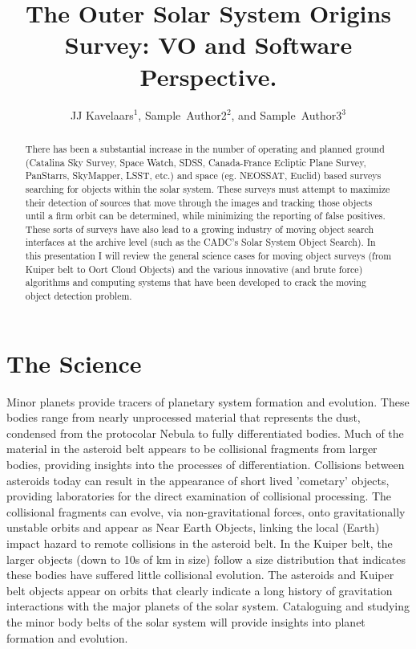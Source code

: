\documentclass[11pt,twoside]{article}
\begin{document}
\title{The Outer Solar System Origins Survey: VO and Software Perspective.}
\author{JJ Kavelaars$^1$, Sample~Author2$^2$, and Sample~Author3$^3$}

\begin{abstract}
There has been a substantial increase in the number of operating and planned ground (Catalina Sky Survey, Space Watch, SDSS, Canada-France Ecliptic Plane Survey, PanStarrs, SkyMapper, LSST, etc.) and space (eg. NEOSSAT, Euclid) based surveys searching for objects within the solar system. These surveys must attempt to maximize their detection of sources that move through the images and tracking those objects until a firm orbit can be determined, while minimizing the reporting of false positives. These sorts of surveys have also lead to a growing industry of moving object search interfaces at the archive level (such as the CADC's Solar System Object Search). In this presentation I will review the general science cases for moving object surveys (from Kuiper belt to Oort Cloud Objects) and the various innovative (and brute force) algorithms and computing systems that have been developed to crack the moving object detection problem.
\end{abstract}

\section{The Science}
Minor planets provide tracers of planetary system formation and evolution. 
These bodies range from nearly unprocessed material that represents the dust, condensed from the protocolar Nebula to fully differentiated bodies. 
Much of the material in the asteroid belt appears to be collisional fragments from larger bodies, providing insights into the processes of differentiation.  
Collisions between asteroids today can result in the appearance of short lived 'cometary' objects, providing laboratories for the direct examination of collisional processing.
The collisional fragments can evolve, via non-gravitational forces, onto gravitationally unstable orbits and appear as Near Earth Objects, linking the local (Earth) impact hazard to remote collisions in the asteroid belt.
In the Kuiper belt, the larger objects (down to 10s of km in size) follow a size distribution that indicates these bodies have suffered little collisional evolution. 
The asteroids and Kuiper belt objects appear on orbits that clearly indicate a long history of gravitation interactions with the major planets of the solar system.
Cataloguing and studying the minor body belts of the solar system will provide insights into planet formation and evolution.
\end{document}
